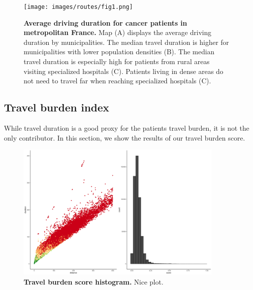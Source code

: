 \begin{figure}[h]
    \texttt{[image: images/routes/fig1.png]}
    \centering
    \caption{ \textbf{Average driving duration for cancer patients in
            metropolitan France.} Map (A) displays the average driving duration by
        municipalities. The median travel duration is higher for municipalities
        with lower population densities (B). The median travel duration is
        especially high for patients from rural areas visiting specialized
        hospitals (C). Patients living in dense areas do not need to travel far
        when reaching specialized hospitals (C). }
    \label{fig:routes-duration-france}
\end{figure}

\subsection{Travel burden index}

While travel duration is a good proxy for the patients travel burden, it is not
the only contributor. In this section, we show the results of our travel burden
score.

\begin{figure}[h]
    \includegraphics[width=0.9\textwidth]{images/routes/fig8_bottom.png}
    \centering
    \caption{ \textbf{Travel burden score histogram.} Nice plot. }
    \label{fig:travel-burden-histogram}
\end{figure}

